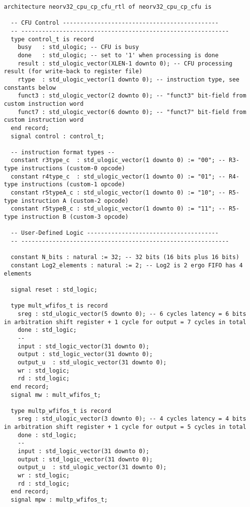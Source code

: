 \begin{code}
\begin{verbatim}
architecture neorv32_cpu_cp_cfu_rtl of neorv32_cpu_cp_cfu is

  -- CFU Control ---------------------------------------------
  -- ------------------------------------------------------------
  type control_t is record
    busy   : std_ulogic; -- CFU is busy
    done   : std_ulogic; -- set to '1' when processing is done
    result : std_ulogic_vector(XLEN-1 downto 0); -- CFU processing result (for write-back to register file)
    rtype  : std_ulogic_vector(1 downto 0); -- instruction type, see constants below
    funct3 : std_ulogic_vector(2 downto 0); -- "funct3" bit-field from custom instruction word
    funct7 : std_ulogic_vector(6 downto 0); -- "funct7" bit-field from custom instruction word
  end record;
  signal control : control_t;

  -- instruction format types --
  constant r3type_c  : std_ulogic_vector(1 downto 0) := "00"; -- R3-type instructions (custom-0 opcode)
  constant r4type_c  : std_ulogic_vector(1 downto 0) := "01"; -- R4-type instructions (custom-1 opcode)
  constant r5typeA_c : std_ulogic_vector(1 downto 0) := "10"; -- R5-type instruction A (custom-2 opcode)
  constant r5typeB_c : std_ulogic_vector(1 downto 0) := "11"; -- R5-type instruction B (custom-3 opcode)

  -- User-Defined Logic --------------------------------------
  -- ------------------------------------------------------------

  constant N_bits : natural := 32; -- 32 bits (16 bits plus 16 bits)
  constant Log2_elements : natural := 2; -- Log2 is 2 ergo FIFO has 4 elements

  signal reset : std_logic;

  type mult_wfifos_t is record
    sreg : std_ulogic_vector(5 downto 0); -- 6 cycles latency = 6 bits in arbitration shift register + 1 cycle for output = 7 cycles in total
    done : std_logic;
    --
    input : std_logic_vector(31 downto 0);
    output : std_logic_vector(31 downto 0);
    output_u  : std_ulogic_vector(31 downto 0);
    wr : std_logic;
    rd : std_logic;
  end record;
  signal mw : mult_wfifos_t;

  type multp_wfifos_t is record
    sreg : std_ulogic_vector(3 downto 0); -- 4 cycles latency = 4 bits in arbitration shift register + 1 cycle for output = 5 cycles in total
    done : std_logic;
    --
    input : std_logic_vector(31 downto 0);
    output : std_logic_vector(31 downto 0);
    output_u  : std_ulogic_vector(31 downto 0);
    wr : std_logic;
    rd : std_logic;
  end record;
  signal mpw : multp_wfifos_t;


\end{verbatim}
\end{code}
